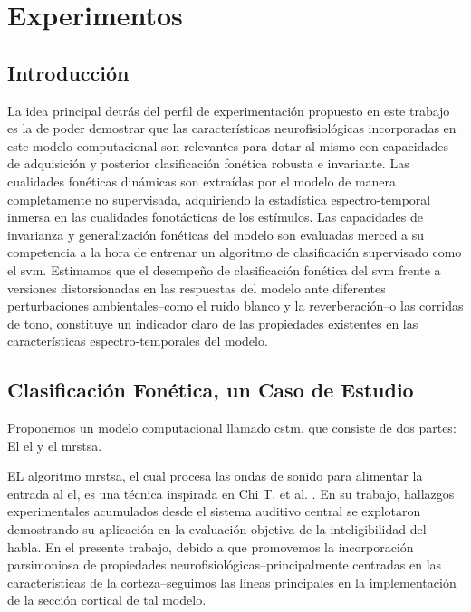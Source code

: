 \chapter{Experimentos}

\label{ch:experiments}

\section{Introducción}

La idea principal detrás del perfil de experimentación propuesto en este trabajo es la de poder demostrar que las características neurofisiológicas incorporadas en este modelo computacional son relevantes para dotar al mismo con capacidades de adquisición y posterior clasificación fonética robusta e invariante. Las cualidades fonéticas dinámicas son extraídas por el modelo de manera completamente no supervisada, adquiriendo la estadística espectro-temporal inmersa en las cualidades fonotácticas de los estímulos. Las capacidades de invarianza y generalización fonéticas del modelo son evaluadas merced a su competencia a la hora de entrenar un algoritmo de clasificación supervisado como el \gls{svm}. Estimamos que el desempeño de clasificación fonética del \gls{svm} frente a versiones distorsionadas en las respuestas del modelo ante diferentes perturbaciones ambientales--como el ruido blanco y la reverberación--o las corridas de tono, constituye un indicador claro de las propiedades existentes en las características espectro-temporales del modelo.

\section{Clasificación Fonética, un Caso de Estudio}

Proponemos un modelo computacional llamado \gls{cstm}, que consiste de dos partes: El \gls{el} y el \gls{mrstsa}.  


EL algoritmo \gls{mrstsa}, el cual procesa las ondas de sonido para alimentar la entrada al \gls{el}, es una técnica inspirada en Chi T. et al. \cite{chi_2005}. En su trabajo, hallazgos experimentales acumulados desde el sistema auditivo central se explotaron demostrando su aplicación en la evaluación objetiva de la inteligibilidad del habla. En el presente trabajo, debido a que promovemos la incorporación parsimoniosa de propiedades neurofisiológicas--principalmente centradas en las características de la corteza--seguimos las líneas principales en la implementación de la sección cortical de tal modelo.

